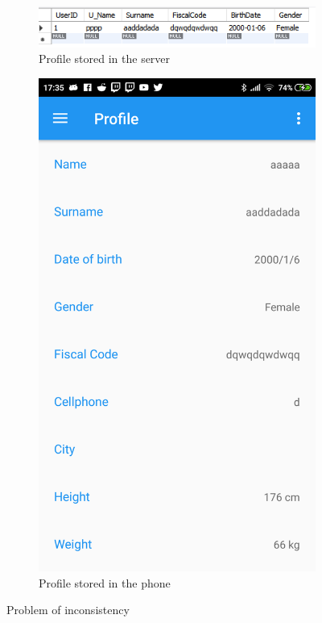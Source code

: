 \begin{figure}
\centering
\begin{subfigure}{.5\textwidth}
  \centering
   \includegraphics[scale=0.7]{resources/userdbnoupdate.png}
  \caption{Profile stored in the server}
  \label{fig:sub1}
\end{subfigure}%
\begin{subfigure}{.5\textwidth}
  \centering
   \includegraphics[scale=0.18]{resources/phoneprofile.png}
  \caption{Profile stored in the phone}
  \label{fig:sub2}
\end{subfigure}
\caption{Problem of inconsistency}
\label{fig:test2}
\end{figure}


